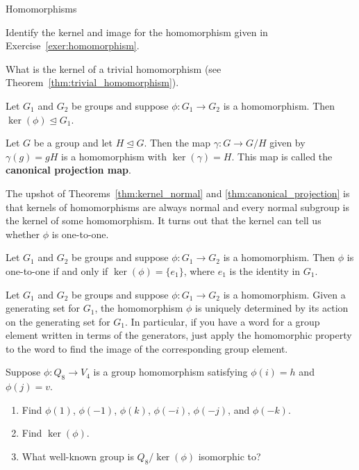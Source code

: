 \begin{section}{Homomorphisms}
\begin{exercise}
Identify the kernel and image for the homomorphism given in Exercise~\ref{exer:homomorphism}.
\end{exercise}

\begin{exercise}
What is the kernel of a trivial homomorphism (see Theorem~\ref{thm:trivial_homomorphism}).
\end{exercise}

\begin{theorem}\label{thm:kernel_normal}
Let $G_1$ and $G_2$ be groups and suppose $\phi:G_1\to G_2$ is a homomorphism. Then $\ker(\phi)\trianglelefteq G_1$.
\end{theorem}

\begin{theorem}\label{thm:canonical_projection}
Let $G$ be a group and let $H\trianglelefteq G$.  Then the map $\gamma:G\to G/H$ given by $\gamma(g)=gH$ is a homomorphism with $\ker(\gamma)=H$. This map is called the \textbf{canonical projection map}.
\end{theorem}

The upshot of Theorems~\ref{thm:kernel_normal} and \ref{thm:canonical_projection} is that kernels of homomorphisms are always normal and every normal subgroup is the kernel of some homomorphism. It turns out that the kernel can tell us whether $\phi$ is one-to-one.

\begin{theorem}
Let $G_1$ and $G_2$ be groups and suppose $\phi:G_1\to G_2$ is a homomorphism. Then $\phi$ is one-to-one if and only if $\ker(\phi)=\{e_1\}$, where $e_1$ is the identity in $G_1$.
\end{theorem}

\begin{remark}
Let $G_1$ and $G_2$ be groups and suppose $\phi:G_1\to G_2$ is a homomorphism. Given a generating set for $G_1$, the homomorphism $\phi$ is uniquely determined by its action on the generating set for $G_1$.  In particular, if you have a word for a group element written in terms of the generators, just apply the homomorphic property to the word to find the image of the corresponding group element.
\end{remark}

\begin{exercise}\label{exer:Q8toV4}
Suppose $\phi: Q_8\to V_{4}$ is a group homomorphism satisfying $\phi(i)=h$ and $\phi(j)=v$.
\begin{enumerate}[label=\rm{(\alph*)}]
\item Find $\phi(1)$, $\phi(-1)$, $\phi(k)$, $\phi(-i)$, $\phi(-j)$, and $\phi(-k)$.
\item Find $\ker(\phi)$.
\item What well-known group is $Q_8/\ker(\phi)$ isomorphic to?
\end{enumerate}
\end{exercise}


\end{section}
